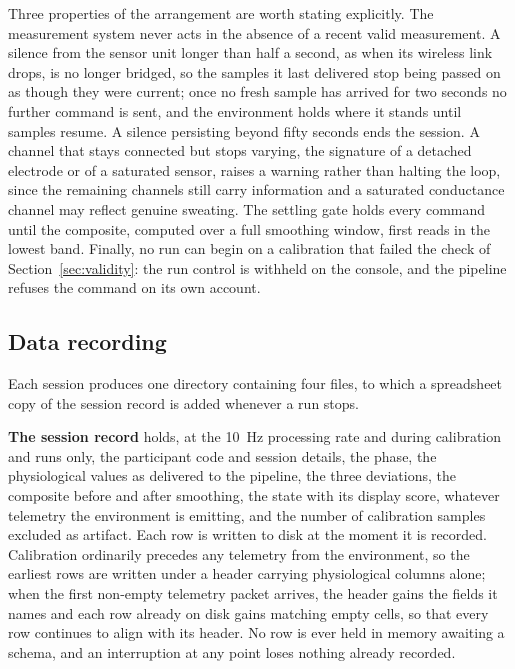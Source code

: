 Three properties of the arrangement are worth stating explicitly.
The measurement system never acts in the absence of a recent
valid measurement. A silence from the sensor unit longer than half
a second, as when its wireless link drops, is no longer bridged,
so the samples it last delivered stop being passed on as though
they were current; once no fresh sample has arrived for two
seconds no further command is sent, and the environment holds
where it stands until samples resume. A silence persisting beyond
fifty seconds ends the session. A channel that stays connected but
stops varying, the signature of a detached electrode or of a
saturated sensor, raises a warning rather than halting the loop,
since the remaining channels still carry information and a
saturated conductance channel may reflect genuine sweating.
The settling gate holds every command until the composite,
computed over a full smoothing window, first reads in the lowest
band.
Finally, no run can begin on a calibration that failed the check
of Section~\ref{sec:validity}: the run control is withheld on the
console, and the pipeline refuses the command on its own account.

\subsection{Data recording}
\label{sec:recording}

Each session produces one directory containing four files, to
which a spreadsheet copy of the session record is added whenever a
run stops.

\textbf{The session record} holds, at the 10~Hz processing rate
and during calibration and runs only, the participant code and
session details, the phase, the physiological values as delivered
to the pipeline, the three deviations, the composite before and
after smoothing, the state with its display score, whatever
telemetry the environment is emitting, and the number of
calibration samples excluded as artifact. Each row is written to
disk at the
moment it is recorded. Calibration ordinarily precedes any
telemetry from the environment, so the earliest rows are written
under a header carrying physiological columns alone; when the
first non-empty telemetry packet arrives, the header gains the
fields it names and each row already on disk gains matching empty
cells, so that every row continues to align with its header. No
row is ever held in memory awaiting a schema, and an interruption
at any point loses nothing already recorded.

